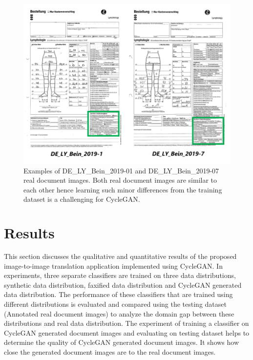 \vspace*{2cm}

\begin{figure}[H]
    \begin{center}
	\includegraphics[scale=0.50]{images/Evaluation/MissclassificationExample.png}
	\caption[Examples of DE\_LY\_Bein\_2019-01 and DE\_LY\_Bein\_2019-07 real document images.]{Examples of DE\_LY\_Bein\_2019-01 and DE\_LY\_Bein\_2019-07 real document images. Both real document images are similar to each other hence learning such minor differences from the training dataset is a challenging for \ac{CycleGAN}.}
	\label{fig:MissclassificationExample}
	\end{center}
\end{figure}


\newpage
\section{Results}\label{results}

This section discusses the qualitative and quantitative results of the proposed image-to-image translation application implemented using \ac{CycleGAN}. In experiments, three separate classifiers are trained on three data distributions, synthetic data distribution, faxified data distribution and \ac{CycleGAN} generated data distribution. The performance of these classifiers that are trained using different distributions is evaluated and compared using the testing dataset (Annotated real document images) to analyze the domain gap between these distributions and real data distribution. The experiment of training a classifier on \ac{CycleGAN} generated document images and evaluating on testing dataset helps to determine the quality of \ac{CycleGAN} generated document images. It shows how close the generated document images are to the real document images.

